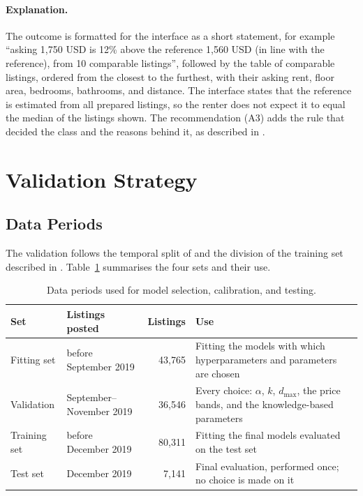 \documentclass[12pt,a4paper]{report}
\begin{document}
\paragraph{Explanation.} The outcome is formatted for the interface as a
short statement, for example ``asking 1,750 USD is 12\% above the reference
1,560 USD (in line with the reference), from 10 comparable listings'',
followed by the table of comparable listings, ordered from the
closest to the furthest, with their asking rent, floor area, bedrooms,
bathrooms, and distance. The interface states that the reference is
estimated from all prepared listings, so the renter does not expect it to
equal the median of the listings shown. The recommendation (A3) adds the rule
that decided the class and the reasons behind it, as described in
.

\section{Validation Strategy}
\label{sec:validation-strategy}

\subsection{Data Periods}

The validation follows the temporal split of  and
the division of the training set described in
. Table~\ref{tab:periods} summarises the four
sets and their use.

\begin{table}[H]
\centering
\caption{Data periods used for model selection, calibration, and testing.}
\label{tab:periods}
\begin{tabularx}{\textwidth}{p{2.4cm} p{3.6cm} r X}
\toprule
\textbf{Set} & \textbf{Listings posted} & \textbf{Listings} & \textbf{Use}\\
\midrule
Fitting set & before September 2019 & 43,765 &
Fitting the models with which hyperparameters and parameters are chosen\\
\addlinespace
Validation & September--November 2019 & 36,546 &
Every choice: $\alpha$, $k$, $d_{\max}$, the price bands, and the
knowledge-based parameters\\
\addlinespace
Training set & before December 2019 & 80,311 &
Fitting the final models evaluated on the test set\\
\addlinespace
Test set & December 2019 & 7,141 &
Final evaluation, performed once; no choice is made on it\\
\bottomrule
\end{tabularx}
\end{table}
\end{document}
